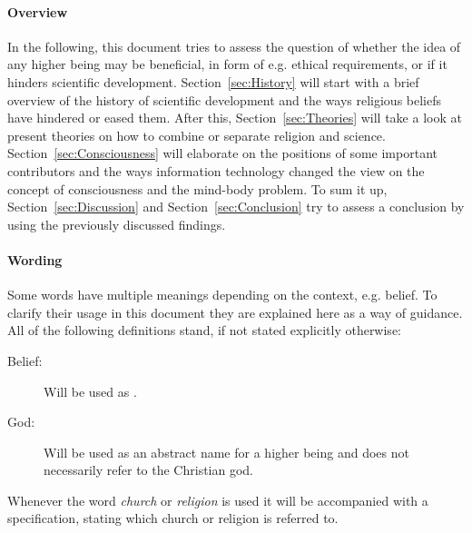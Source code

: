 \paragraph{Overview}
In the following, this document tries to assess the question of whether the idea of any higher being may be beneficial, in form of e.g. ethical requirements, or if it hinders scientific development.
Section~\ref{sec:History} will start with a brief overview of the history of scientific development and the ways religious beliefs have hindered or eased them.
After this, Section~\ref{sec:Theories} will take a look at present theories on how to combine or separate religion and science.
Section~\ref{sec:Consciousness} will elaborate on the positions of some important contributors and the ways information technology changed the view on the concept of consciousness and the mind-body problem.
To sum it up,  Section~\ref{sec:Discussion} and Section~\ref{sec:Conclusion} try to assess a conclusion by using the previously discussed findings.

\paragraph{Wording}
Some words have multiple meanings depending on the context, e.g. belief.
To clarify their usage in this document they are explained here as a way of guidance.
All of the following definitions stand, if not stated explicitly otherwise:
\begin{description}
    \item[Belief:] Will be used as .
    \item[God:] Will be used as an abstract name for a higher being and does not necessarily refer to the Christian god.
\end{description}
Whenever the word \emph{church} or \emph{religion} is used it will be accompanied with a specification, stating which church or religion is referred to.